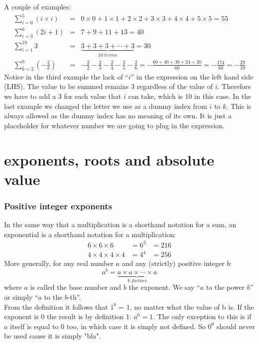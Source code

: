 \noindent A couple of examples:
\begin{eqnarray*}
\sum\limits_{i = 0}^{5} \left( i\times i \right) &  = & 0\times 0 + 1 \times 1 + 2\times 2 + 3 \times 3 + 4 \times 4 + 5\times 5 = 55 \\
\sum\limits_{i = 3}^{6} \left(2i + 1\right) & = & 7 + 9 + 11 + 13 = 40 \\
\sum\limits_{i = 1}^{10} 3 & = & \underbrace{3 + 3 + 3 +\cdots + 3}_{10 \; terms} = 30\\ 
\sum\limits_{k = 2}^{6} \left( -\frac{2}{k}\right) &= & -\frac{2}{2} -\frac{2}{3} -\frac{2}{4}-\frac{2}{5} -\frac{2}{6} = -\frac{60 + 40 + 30 + 24 + 20}{60} = -\frac{174}{60} =  - \frac{29}{10}
\end{eqnarray*}
Notice in the third example the lack of "`$i$"' in the expression on the left hand side (LHS). The value to be summed remains 3 regardless of the value of $i$. Therefore we have to add a 3 for each value that $i$ can take, which is 10 in this case. In the last example we changed the letter we use as a dummy index from $i$ to $k$. This is always allowed as the dummy index has no meaning of its own. It is just a placeholder for whatever number we are going to plug in the expression.

\section{exponents, roots and absolute value}

\subsubsection{Positive integer exponents}

\noindent In the same way that a multiplication is a shorthand notation for a sum, an exponential is a shorthand notation for a multiplication:
\begin{eqnarray*}
6 \times 6 \times 6 & =  6^3 & =  216 \\
4 \times 4 \times 4 \times 4 & =  4^4 & =  256
\end{eqnarray*}
More generally, for any real number $a$ and any (strictly) positive integer $b$:
$$
a^b = \underbrace{a \times a \times \cdots \times a}_{b \; factors}
$$
where $a$ is called the base number and $b$ the exponent. We say "`$a$ to the power $b$"' or simply "`$a$ to the $b$-th"'.\\

\noindent From the definition it follows that $1^b$ = 1, no matter what the value of b is. If the exponent is 0 the result is by definition 1: $a^0 = 1$. The only exception to this is if $a$ itself is equal to 0 too, in which case it is simply not defined. So $0^0$ should never be used cause it is simply "bla".\\

